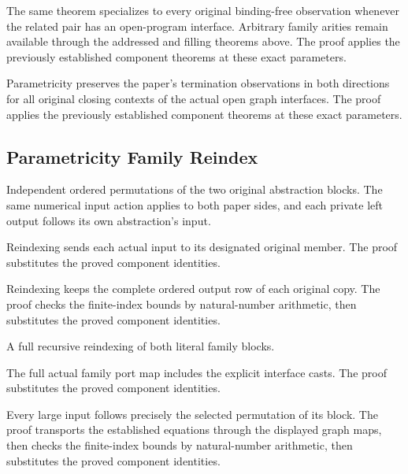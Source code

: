 The same theorem specializes to every original binding-free observation
whenever the related pair has an open-program interface. Arbitrary family
arities remain available through the addressed and filling theorems above.
The proof applies the previously established component theorems at these exact parameters.
\par{}

Parametricity preserves the paper's termination observations in both directions
for all original closing contexts of the actual open graph interfaces.
The proof applies the previously established component theorems at these exact parameters.
\par{}

\subsection{Parametricity Family Reindex}
Independent ordered permutations of the two original abstraction blocks.
The same numerical input action applies to both paper sides, and each private
left output follows its own abstraction's input.

Reindexing sends each actual input to its designated original member.
The proof substitutes the proved component identities.
\par{}

Reindexing keeps the complete ordered output row of each original copy.
The proof checks the finite-index bounds by natural-number arithmetic, then substitutes the proved component identities.
\par{}

A full recursive reindexing of both literal family blocks.
\par{}

The full actual family port map includes the explicit interface casts.
The proof substitutes the proved component identities.
\par{}

Every large input follows precisely the selected permutation of its block.
The proof transports the established equations through the displayed graph maps, then checks the finite-index bounds by natural-number arithmetic, then substitutes the proved component identities.
\par{}

